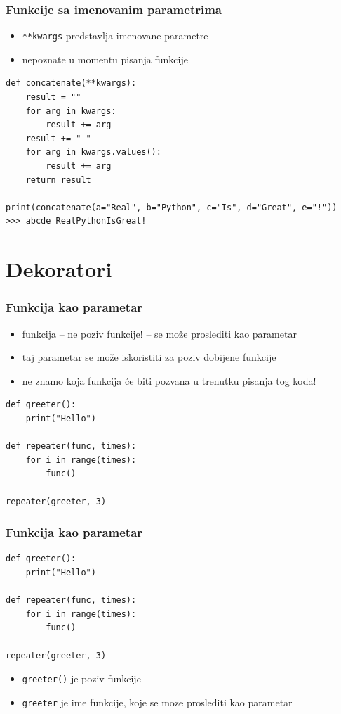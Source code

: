 \documentclass[compress]{beamer}
\begin{document}
\begin{frame}[fragile]
  \frametitle{Funkcije sa imenovanim parametrima}
  \begin{itemize}
    \item \texttt{**kwargs} predstavlja imenovane parametre
    \item nepoznate u momentu pisanja funkcije
  \end{itemize}
\begin{verbatim}
def concatenate(**kwargs):
    result = ""
    for arg in kwargs:
        result += arg
    result += " "
    for arg in kwargs.values():
        result += arg
    return result

print(concatenate(a="Real", b="Python", c="Is", d="Great", e="!"))
>>> abcde RealPythonIsGreat!
\end{verbatim}
\end{frame}

\section[Dekoratori]{Dekoratori}

\begin{frame}[fragile]
  \frametitle{Funkcija kao parametar}
  \begin{itemize}
    \item funkcija -- ne poziv funkcije! -- se može proslediti kao parametar
    \item taj parametar se može iskoristiti za poziv dobijene funkcije
    \item ne znamo koja funkcija će biti pozvana u trenutku pisanja tog koda!
  \end{itemize}
\begin{verbatim}
def greeter():
    print("Hello")

def repeater(func, times):
    for i in range(times):
        func()

repeater(greeter, 3)
\end{verbatim}
\end{frame}

\begin{frame}[fragile]
  \frametitle{Funkcija kao parametar}
\begin{verbatim}
def greeter():
    print("Hello")

def repeater(func, times):
    for i in range(times):
        func()

repeater(greeter, 3)
\end{verbatim}
  \begin{itemize}
    \item \texttt{greeter()} je poziv funkcije
    \item \texttt{greeter} je ime funkcije, koje se moze proslediti kao parametar
  \end{itemize}
\end{frame}
\end{document}
